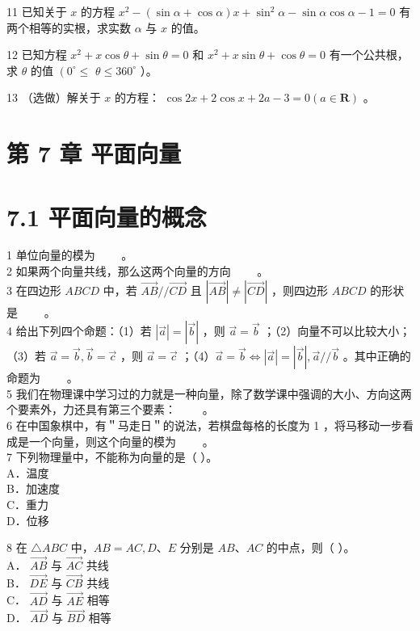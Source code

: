 \documentclass[10pt]{article}
\begin{document}
11 已知关于 \(x\) 的方程 \(x^{2}-(\sin \alpha+\cos \alpha) x+\sin ^{2} \alpha-\sin \alpha \cos \alpha-1=0\) 有两个相等的实根，求实数 \(\alpha\) 与 \(x\) 的值。

12 已知方程 \(x^{2}+x \cos \theta+\sin \theta=0\) 和 \(x^{2}+x \sin \theta+\cos \theta=0\) 有一个公共根，求 \(\theta\) 的值 \(\left(0^{\circ} \leqslant\right.\) \(\theta \leqslant 360^{\circ}\) ）。

13 （选做）解关于 \(x\) 的方程： \(\cos 2 x+2 \cos x+2 a-3=0(a \in \mathbf{R})\) 。

\section*{第 7 章 平面向量}
\section*{7.1 平面向量的概念}
1 单位向量的模为 \(\qquad\)。\\
2 如果两个向量共线，那么这两个向量的方向 \(\qquad\)。\\
3 在四边形 \(A B C D\) 中，若 \(\overrightarrow{A B} / / \overrightarrow{C D}\) 且 \(|\overrightarrow{A B}| \neq|\overrightarrow{C D}|\) ，则四边形 \(A B C D\) 的形状是 \(\qquad\)。\\
4 给出下列四个命题：（1）若 \(|\vec{a}|=|\vec{b}|\) ，则 \(\vec{a}=\vec{b}\) ；（2）向量不可以比较大小；（3）若 \(\vec{a}=\vec{b}, \vec{b}=\vec{c}\) ，则 \(\vec{a}=\vec{c}\) ；（4）\(\vec{a}=\vec{b} \Leftrightarrow|\vec{a}|=|\vec{b}|, \vec{a} / / \vec{b}\) 。其中正确的命题为 \(\qquad\)。\\
5 我们在物理课中学习过的力就是一种向量，除了数学课中强调的大小、方向这两个要素外，力还具有第三个要素： \(\qquad\)。\\
6 在中国象棋中，有＂马走日＂的说法，若棋盘每格的长度为 1 ，将马移动一步看成是一个向量，则这个向量的模为 \(\qquad\)。\\
7 下列物理量中，不能称为向量的是（ ）。\\
A．温度\\
B．加速度\\
C．重力\\
D．位移

8 在 \(\triangle A B C\) 中，\(A B=A C, D 、 E\) 分别是 \(A B 、 A C\) 的中点，则（ ）。\\
A． \(\overrightarrow{A B}\) 与 \(\overrightarrow{A C}\) 共线\\
B． \(\overrightarrow{D E}\) 与 \(\overrightarrow{C B}\) 共线\\
C． \(\overrightarrow{A D}\) 与 \(\overrightarrow{A E}\) 相等\\
D． \(\overrightarrow{A D}\) 与 \(\overrightarrow{B D}\) 相等
\end{document}
